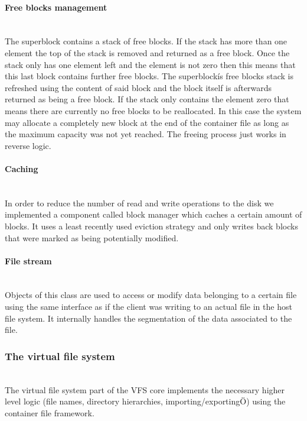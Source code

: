 \documentclass{scrartcl}
\begin{document}
\paragraph{Free blocks management} \ \\
The superblock contains a stack of free blocks.
If the stack has more than one element the top of the stack is removed and
returned as a free block.
Once the stack only has one element left and the element is not zero then this
means that this last block contains further free blocks. The superblockís free
blocks stack is refreshed using the content of said block and the block itself
is afterwards returned as being a free block.
If the stack only contains the element zero that means there are currently no
free blocks to be reallocated. In this case the system may allocate a
completely new block at the end of the container file as long as the maximum
capacity was not yet reached.
The freeing process just works in reverse logic.

\paragraph{Caching} \ \\
In order to reduce the number of read and write operations to the disk we
implemented a component called block manager which caches a certain amount of
blocks. It uses a least recently used eviction strategy and only writes back
blocks that were marked as being potentially modified.

\paragraph{File stream} \ \\
Objects of this class are used to access or modify data belonging to a certain
file using the same interface as if the client was writing to an actual file in
the host file system. It internally handles the segmentation of the data
associated to the file.


\subsubsection{The virtual file system} \ \\
The virtual file system part of the VFS core implements the necessary higher
level logic (file names, directory hierarchies, importing/exportingÖ) using the
container file framework.
\end{document}
